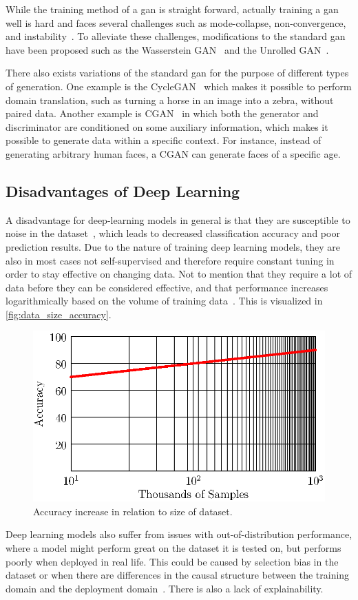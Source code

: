 While the training method of a \gls*{gan} is straight forward, actually training a \gls*{gan} well is hard and faces several challenges such as mode-collapse, non-convergence, and instability~\cite{gan_challenges,gan_challenges2}. To alleviate these challenges, modifications to the standard \gls*{gan} have been proposed such as the Wasserstein GAN~\cite{wgan} and the Unrolled GAN~\cite{unrolled_gan}.
\par
There also exists variations of the standard \gls*{gan} for the purpose of different types of generation. One example is the CycleGAN~\cite{CycleGAN} which makes it possible to perform domain translation, such as turning a horse in an image into a zebra, without paired data. Another example is CGAN~\cite{cgan}  in which both the generator and discriminator are conditioned on some auxiliary information, which makes it possible to generate data within a specific context. For instance, instead of generating arbitrary human faces, a CGAN can generate faces of a specific age.
\subsection{Disadvantages of Deep Learning}
A disadvantage for deep-learning models in general is that they are susceptible to noise in the dataset~\cite{noise1,noise2}, which leads to decreased classification accuracy and poor prediction results. Due to the nature of training deep learning models, they are also in most cases not self-supervised and therefore require constant tuning in order to stay effective on changing data. Not to mention that they require a lot of data before they can be considered effective, and that performance increases logarithmically based on the volume of training data~\cite{deeplearning_dataset}. This is visualized in \autoref{fig:data_size_accuracy}.
\begin{figure}[H]
    \centering
    \includegraphics[width=0.8\linewidth]{resources/related_works/training_volume}
    \caption[Dataset Volume Accuracy]{Accuracy increase in relation to size of dataset.}
    \label{fig:data_size_accuracy}
\end{figure}
Deep learning models also suffer from issues with out-of-distribution performance, where a model might perform great on the dataset it is tested on, but performs poorly when deployed in real life. This could be caused by selection bias in the dataset or when there are differences in the causal structure between the training domain and the deployment domain~\cite{deeplearning_ood}. There is also a lack of explainability.
